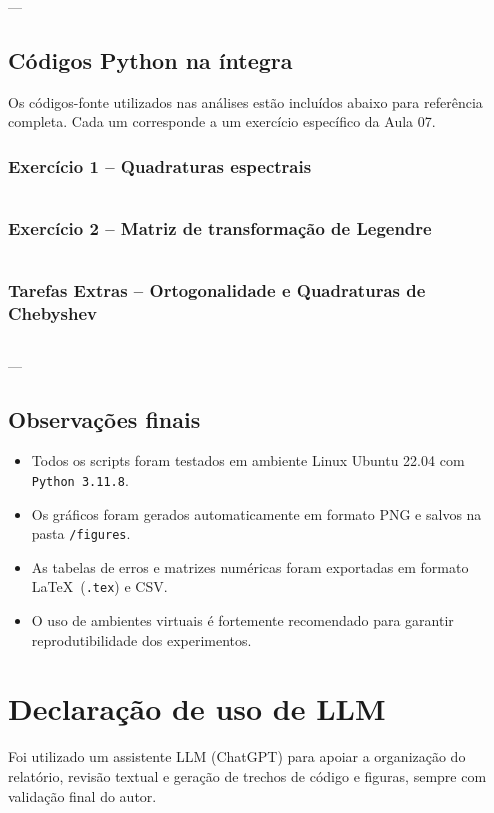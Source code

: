 \documentclass[12pt,a4paper]{article}
\begin{document}
---

\subsection{Códigos Python na íntegra}

Os códigos-fonte utilizados nas análises estão incluídos abaixo para referência completa.  
Cada um corresponde a um exercício específico da Aula 07.

\subsubsection{Exercício 1 – Quadraturas espectrais}
\inputminted[breaklines,fontsize=\footnotesize]{python}{code/aula07_tarefa1_quadraturas.py}

\subsubsection{Exercício 2 – Matriz de transformação de Legendre}
\inputminted[breaklines,fontsize=\footnotesize]{python}{code/aula07_ex2_legendre_matrix.py}

\subsubsection{Tarefas Extras – Ortogonalidade e Quadraturas de Chebyshev}
\inputminted[breaklines,fontsize=\footnotesize]{python}{code/aula07_tarefas_extras.py}

---

\subsection{Observações finais}
\begin{itemize}
  \item Todos os scripts foram testados em ambiente Linux Ubuntu 22.04 com \texttt{Python 3.11.8}.  
  \item Os gráficos foram gerados automaticamente em formato PNG e salvos na pasta \texttt{/figures}.  
  \item As tabelas de erros e matrizes numéricas foram exportadas em formato \LaTeX~(\texttt{.tex}) e CSV.  
  \item O uso de ambientes virtuais é fortemente recomendado para garantir reprodutibilidade dos experimentos.
\end{itemize}




\section{Declaração de uso de LLM}
Foi utilizado um assistente LLM (ChatGPT) para apoiar a organização do relatório, revisão textual e geração de trechos de código e figuras, sempre com validação final do autor.
\end{document}
